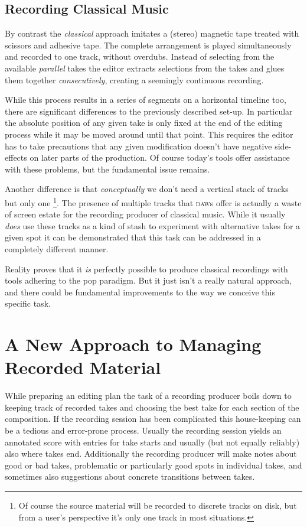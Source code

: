 \documentclass[11pt,a4paper]{article}
\begin{document}
\subsection{Recording Classical Music}
 
By contrast the \emph{classical} approach imitates a (stereo) magnetic tape
treated with scissors and adhesive tape.
The complete arrangement is played simultaneously and recorded to one track,
without overdubs.
Instead of selecting from the available \emph{parallel} takes the editor
extracts selections from the takes and glues them together \emph{consecutively},
creating a seemingly continuous recording.

While this process results in a series of segments on a horizontal timeline too,
there are significant differences to the previously described set-up.
In particular the absolute position of any given take is only fixed at
the end of the editing process while it may be moved around until that point.
This requires the editor has to take precautions that any given modification
doesn't have negative side-effects on later parts of the production.
Of course today's tools offer assistance with these problems, but the fundamental
issue remains.

Another difference is that \emph{conceptually} we don't need a vertical stack of
tracks but only one%
\footnote{Of course the source material will be recorded to discrete tracks on
disk, but from a user's perspective it's only one track in most situations.}.
The presence of multiple tracks that \textsc{daw}s offer is actually a waste of
screen estate for the recording producer of classical music.
While it usually \emph{does} use these tracks as a kind of stash to experiment
with alternative takes for a given spot it can be demonstrated that this task can be
addressed in a completely different manner.

Reality proves that it \emph{is} perfectly possible to produce classical
recordings with tools adhering to the pop paradigm.
But it just isn't a really natural approach, and there could be fundamental
improvements to the way we conceive this specific task. 

\section{A New Approach to Managing Recorded Material}

While preparing an editing plan the task of a recording producer boils down to
keeping track of recorded takes and choosing the best take for each section of
the composition.
If the recording session has been complicated this house-keeping can be a
tedious and error-prone process.
Usually the recording session yields an annotated score with entries for take
starts and usually (but not equally reliably) also where takes end.
Additionally the recording producer will make notes about good or bad takes,
problematic or particularly good spots in individual takes, and sometimes also
suggestions about concrete transitions between takes.
\end{document}
